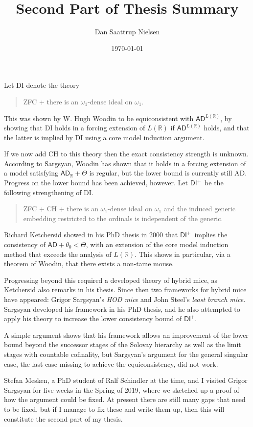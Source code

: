 \documentclass[a4paper,11pt]{article}
\newcommand{\dip}{$\textsf{DI}^+$}
\begin{document}
  \title{Second Part of Thesis Summary}
  \author{Dan Saattrup Nielsen}
  \date{\today}
  \maketitle
  \thispagestyle{empty} %

  Let \textsf{DI} denote the theory

  \begin{quote}
    \centering
    \textsf{ZFC} + there is an $\omega_1$-dense ideal on $\omega_1$.
  \end{quote}

  This was shown by W. Hugh Woodin to be equiconsistent with $\textsf{AD}^{L(\mathbb R)}$, by showing that \textsf{DI} holds in a forcing extension of $L(\mathbb R)$ if $\textsf{AD}^{L(\mathbb R)}$ holds, and that the latter is implied by \textsf{DI} using a core model induction argument.

  If we now add \textsf{CH} to this theory then the exact consistency strength is unknown. According to Sargsyan, Woodin has shown that it holds in a forcing extension of a model satisfying $\textsf{AD}_{\mathbb R}+\Theta\text{ is regular}$, but the lower bound is currently still \textsf{AD}. Progress on the lower bound has been achieved, however. Let \dip\ be the following strengthening of \textsf{DI}.

  \begin{quote}
    \centering
    \textsf{ZFC} + \textsf{CH} + there is an $\omega_1$-dense ideal on $\omega_1$ and the induced generic embedding restricted to the ordinals is independent of the generic.
  \end{quote}

  Richard Ketchersid showed in his PhD thesis in 2000 that \dip\ implies the consistency of $\textsf{AD}+\theta_0<\Theta$, with an extension of the core model induction method that exceeds the analysis of $L(\mathbb R)$. This shows in particular, via a theorem of Woodin, that there exists a non-tame mouse.

  Progressing beyond this required a developed theory of hybrid mice, as Ketchersid also remarks in his thesis. Since then two frameworks for hybrid mice have appeared: Grigor Sargsyan's \textit{HOD mice} and John Steel's \textit{least branch mice}. Sargsyan developed his framework in his PhD thesis, and he also attempted to apply his theory to increase the lower consistency bound of \dip. 
  
  A simple argument shows that his framework allows an improvement of the lower bound beyond the successor stages of the Solovay hierarchy as well as the limit stages with countable cofinality, but Sargsyan's argument for the general singular case, the last case missing to achieve the equiconsistency, did not work.

  Stefan Mesken, a PhD student of Ralf Schindler at the time, and I visited Grigor Sargsyan for five weeks in the Spring of 2019, where we sketched up a proof of how the argument could be fixed. At present there are still many gaps that need to be fixed, but if I manage to fix these and write them up, then this will constitute the second part of my thesis.
\end{document}
